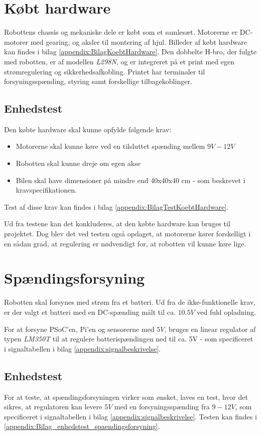 %

%

\section{Købt hardware}
Robottens chassis og mekaniske dele er købt som et samlesæt. 
Motorerne er DC-motorer med gearing, og aksler til montering af hjul.
Billeder af købt hardware kan findes i bilag \ref{appendix:BilagKoebtHardware}.
Den dobbelte H-bro, der fulgte med robotten, er af modellen \textit{L298N}, og er integreret på et print med egen strømregulering og sikkerhedsafkobling. 
Printet har terminaler til forsyningsspænding, styring samt forskellige tilbagekoblinger.
\newpage
\subsection{Enhedstest}
Den købte hardware skal kunne opfylde følgende krav:
\begin{itemize}
\item Motorerne skal kunne køre ved en tilsluttet spænding mellem $9V - 12V$
\item Robotten skal kunne dreje om egen akse
\item Bilen skal have dimensioner på mindre end 40x40x40 cm - som beskrevet i kravspecifikationen. 
\end{itemize}

Test af disse krav kan findes i bilag \ref{appendix:BilagTestKoebtHardware}.

Ud fra testene kan det konkluderes, at den købte hardware kan bruges til projektet. Dog blev det ved testen også opdaget, at motorerne kører forskelligt i en sådan grad, at regulering er nødvendigt for, at robotten vil kunne køre lige.

\section{Spændingsforsyning}
Robotten skal forsynes med strøm fra et batteri. Ud fra de ikke-funktionelle krav, er der valgt et batteri med en DC-spænding målt til ca. $10.5 V$ ved fuld opladning.

For at forsyne PSoC'en, Pi'en og sensorerne med $5 V$, bruges en linear regulator af typen \textit{LM350T} til at regulere batterispændingen ned til ca. 5V - som specificeret i signaltabellen i bilag \ref{appendix:signalbeskrivelse}.

\subsection{Enhedstest}
For at teste, at spændingsforsyningen virker som ønsket, laves en test, hvor det sikres, at regulatoren kan levere $5 V$ med en forsyningsspænding fra $ 9-12 V $, som specificeret i signaltabellen i bilag \ref{appendix:signalbeskrivelse}. 
Testen kan findes i \ref{appendix:Bilag_enhedstest_spaendingsforsyning}.


